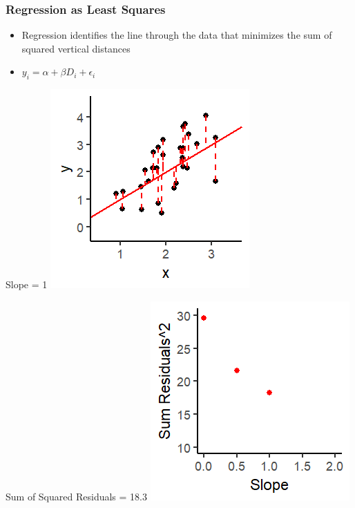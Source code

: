 \documentclass[xcolor=x11names,compress]{beamer}\usepackage[]{graphicx}\usepackage[]{color}
\makeatletter
\def\maxwidth{ %
  \ifdim\Gin@nat@width>\linewidth
    \linewidth
  \else
    \Gin@nat@width
  \fi
}
\newenvironment{knitrout}{}{} %
\renewcommand{\(}{\begin{columns}}
\renewcommand{\)}{\end{columns}}
\newcommand{\<}[1]{\begin{column}{#1}}
\renewcommand{\>}{\end{column}}
\makeatother
\begin{document}
\begin{frame}
\frametitle{Regression as Least Squares}
\begin{itemize}
\item Regression identifies the line through the data that minimizes the sum of squared vertical distances 
\item $y_i = \alpha + \beta D_i + \epsilon_i$
\end{itemize}
\begin{multicols}{2}
Slope = 1
\begin{knitrout}
\color{fgcolor}
\includegraphics[width=\maxwidth]{figure/graph_ols3-1} 

\end{knitrout}
\columnbreak
Sum of Squared Residuals = 18.3
\begin{knitrout}
\color{fgcolor}
\includegraphics[width=\maxwidth]{figure/graph_ssr3-1} 

\end{knitrout}
\end{multicols}
\end{frame}
\end{document}
